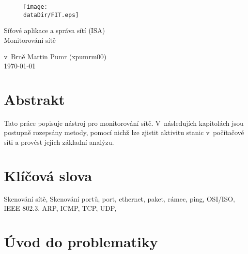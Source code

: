 \documentclass[a4paper,11pt,onecolumn,notitlepage]{article}
\def \dataDir {data}
\begin{document}
\begin{center}
    \begin{figure}[hb]
        \centering
        \texttt{[image: \\dataDir/FIT.eps]}
        \label{fig:FIT}
    \end{figure}
\LARGE
    Síťové aplikace a správa sítí (ISA)\\
\Huge
    Monitorování sítě\\
\end{center}

{\Large v~Brně \hfill Martin Pumr (xpumrm00)\\
\today}

\newpage


\tableofcontents
\newpage
\section*{Abstrakt}
\paragraph{} Tato práce popisuje nástroj pro monitorování sítě. V~následujích kapitolách jsou postupně rozepsány metody, pomocí nichž lze zjistit aktivitu stanic v~počítačové síti a provést jejich základní analýzu.
\vspace{7cm}
\section*{Klíčová slova}
Skenování sítě, Skenování portů, port, ethernet, paket, rámec, ping,
OSI/ISO, IEEE 802.3, ARP, ICMP, TCP, UDP,
\newpage

\section{Úvod do problematiky}
\end{document}
